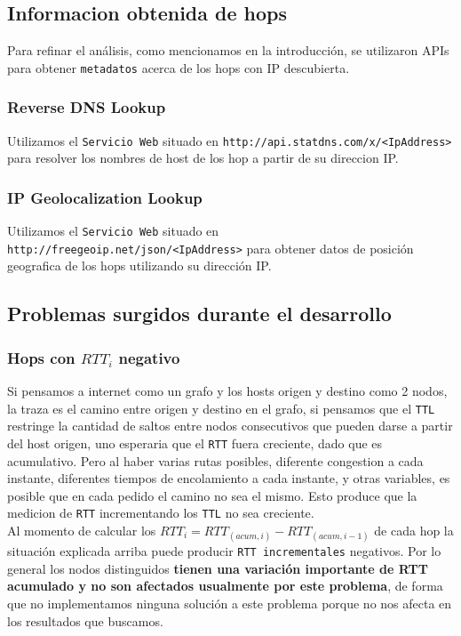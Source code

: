\subsection{Informacion obtenida de hops}
Para refinar el análisis, como mencionamos en la introducción, se utilizaron APIs para obtener \texttt{metadatos} acerca de los hops con IP descubierta.

\subsubsection{Reverse DNS Lookup}
Utilizamos el \texttt{Servicio Web} situado en \texttt{http://api.statdns.com/x/<IpAddress>} para resolver los nombres de host de los hop a partir de su direccion IP.

\subsubsection{IP Geolocalization Lookup}
Utilizamos el \texttt{Servicio Web} situado en \texttt{http://freegeoip.net/json/<IpAddress>} para obtener datos de posición geografica de los hops utilizando su dirección IP.

\subsection{Problemas surgidos durante el desarrollo}
\subsubsection{Hops con $RTT_i$ negativo}
Si pensamos a internet como un grafo y los hosts origen y destino como 2 nodos, la traza es el camino entre origen y destino en el grafo, si pensamos que el \texttt{TTL} restringe la cantidad de saltos entre nodos consecutivos que pueden darse a partir del host origen, uno esperaria que el \texttt{RTT} fuera creciente, dado que es acumulativo. Pero al haber varias rutas posibles, diferente congestion a cada instante, diferentes tiempos de encolamiento a cada instante, y otras variables, es posible que en cada pedido el camino no sea el mismo. Esto produce que la medicion de \texttt{RTT} incrementando los \texttt{TTL} no sea creciente.\\

Al momento de calcular los $RTT_i = RTT_{(acum, i)} - RTT_{(acum, i-1)}$ de cada hop la situación explicada arriba puede producir \texttt{RTT incrementales} negativos. Por lo general los nodos distinguidos \textbf{tienen una variación importante de RTT acumulado y no son afectados usualmente por este problema}, de forma que no implementamos ninguna soluci\'on a este problema porque no nos afecta en los resultados que buscamos.

